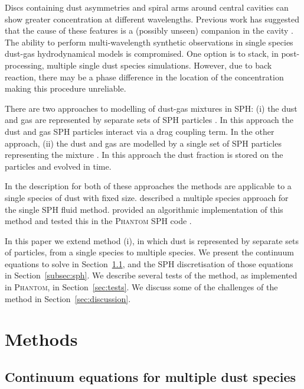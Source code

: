 \documentclass[fleqn,usenatbib]{mnras}
\begin{document}
Discs containing dust asymmetries and spiral arms around central cavities can
show greater concentration at different wavelengths. Previous work has suggested
that the cause of these features is a (possibly unseen) companion in the cavity
\citep{Price2018MNRAS.477.1270P, Poblete2019MNRAS.489.2204P}. The ability to
perform multi-wavelength synthetic observations in single species dust-gas
hydrodynamical models is compromised. One option is to stack, in
post-processing, multiple single dust species simulations. However, due to back
reaction, there may be a phase difference in the location of the concentration
making this procedure unreliable.

There are two approaches to modelling of dust-gas mixtures in SPH: (i) the dust
and gas are represented by separate sets of SPH particles
\citep{Monaghan1995CoPhC..87..225M, Laibe2012MNRAS.420.2345L,
Laibe2012MNRAS.420.2365L}. In this approach the dust and gas SPH particles
interact via a drag coupling term. In the other approach, (ii) the dust and gas
are modelled by a single set of SPH particles representing the mixture
\citep{Price2015MNRAS.451..813P}. In this approach the dust fraction is stored
on the particles and evolved in time.

In the description for both of these approaches the methods are applicable to a
single species of dust with fixed size. \citet{Laibe2014MNRAS.444.1940L}
described a multiple species approach for the single SPH fluid method.
\citet{Hutchison2018MNRAS.476.2186H} provided an algorithmic implementation of
this method and tested this in the \textsc{Phantom} SPH code
\citep{Price2018PASA...35...31P}.

In this paper we extend method (i), in which dust is represented by separate
sets of particles, from a single species to multiple species. We present the
continuum equations to solve in Section~\ref{subsec:continuum}, and the SPH
discretisation of those equations in Section~\ref{subsec:sph}. We describe
several tests of the method, as implemented in \textsc{Phantom}, in
Section~\ref{sec:tests}. We discuss some of the challenges of the method in
Section~\ref{sec:discussion}.

\section{Methods}

\subsection{Continuum equations for multiple dust species}%
\label{subsec:continuum}
\end{document}
